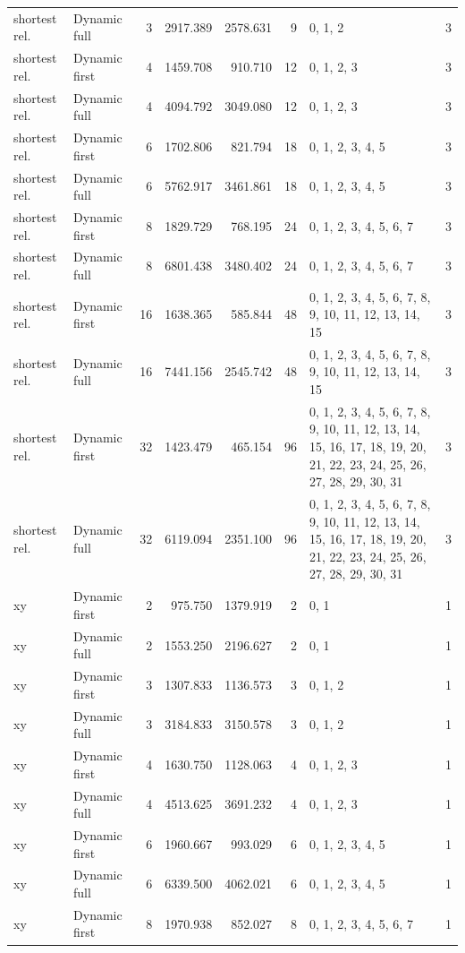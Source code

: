 \documentclass[10pt,a4paper]{article}
\begin{document}
\begin{longtable}{@{}p{23mm}p{29mm}rrrrp{36mm}r@{}}
shortest rel. & Dynamic full & 3 & 2917.389 & 2578.631 & 9 & 0, 1, 2 & 3 \\
shortest rel. & Dynamic first & 4 & 1459.708 & 910.710 & 12 & 0, 1, 2, 3 & 3 \\
shortest rel. & Dynamic full & 4 & 4094.792 & 3049.080 & 12 & 0, 1, 2, 3 & 3 \\
shortest rel. & Dynamic first & 6 & 1702.806 & 821.794 & 18 & 0, 1, 2, 3, 4, 5 & 3 \\
shortest rel. & Dynamic full & 6 & 5762.917 & 3461.861 & 18 & 0, 1, 2, 3, 4, 5 & 3 \\
shortest rel. & Dynamic first & 8 & 1829.729 & 768.195 & 24 & 0, 1, 2, 3, 4, 5, 6, 7 & 3 \\
shortest rel. & Dynamic full & 8 & 6801.438 & 3480.402 & 24 & 0, 1, 2, 3, 4, 5, 6, 7 & 3 \\
shortest rel. & Dynamic first & 16 & 1638.365 & 585.844 & 48 & 0, 1, 2, 3, 4, 5, 6, 7, 8, 9, 10, 11, 12, 13, 14, 15 & 3 \\
shortest rel. & Dynamic full & 16 & 7441.156 & 2545.742 & 48 & 0, 1, 2, 3, 4, 5, 6, 7, 8, 9, 10, 11, 12, 13, 14, 15 & 3 \\
shortest rel. & Dynamic first & 32 & 1423.479 & 465.154 & 96 & 0, 1, 2, 3, 4, 5, 6, 7, 8, 9, 10, 11, 12, 13, 14, 15, 16, 17, 18, 19, 20, 21, 22, 23, 24, 25, 26, 27, 28, 29, 30, 31 & 3 \\
shortest rel. & Dynamic full & 32 & 6119.094 & 2351.100 & 96 & 0, 1, 2, 3, 4, 5, 6, 7, 8, 9, 10, 11, 12, 13, 14, 15, 16, 17, 18, 19, 20, 21, 22, 23, 24, 25, 26, 27, 28, 29, 30, 31 & 3 \\
xy & Dynamic first & 2 & 975.750 & 1379.919 & 2 & 0, 1 & 1 \\
xy & Dynamic full & 2 & 1553.250 & 2196.627 & 2 & 0, 1 & 1 \\
xy & Dynamic first & 3 & 1307.833 & 1136.573 & 3 & 0, 1, 2 & 1 \\
xy & Dynamic full & 3 & 3184.833 & 3150.578 & 3 & 0, 1, 2 & 1 \\
xy & Dynamic first & 4 & 1630.750 & 1128.063 & 4 & 0, 1, 2, 3 & 1 \\
xy & Dynamic full & 4 & 4513.625 & 3691.232 & 4 & 0, 1, 2, 3 & 1 \\
xy & Dynamic first & 6 & 1960.667 & 993.029 & 6 & 0, 1, 2, 3, 4, 5 & 1 \\
xy & Dynamic full & 6 & 6339.500 & 4062.021 & 6 & 0, 1, 2, 3, 4, 5 & 1 \\
xy & Dynamic first & 8 & 1970.938 & 852.027 & 8 & 0, 1, 2, 3, 4, 5, 6, 7 & 1 \\

\end{longtable}
\end{document}
